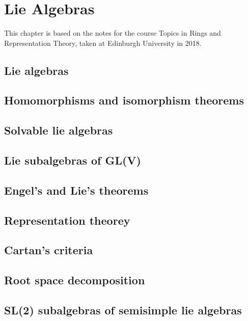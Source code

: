 \chapter{Lie Algebras}\label{cha:lie-algebras}
This chapter is based on the notes for the course Topics in Rings and Representation Theory, taken at Edinburgh University in 2018.

\section{Lie algebras}

\section{Homomorphisms and isomorphism theorems}

\section{Solvable lie algebras}

\section{Lie subalgebras of GL(V)}

\section{Engel's and Lie's theorems}

\section{Representation theorey}

\section{Cartan's criteria}

\section{Root space decomposition}

\section{SL(2) subalgebras of semisimple lie algebras}


